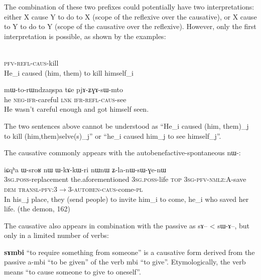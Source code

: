 \documentclass[oldfontcommands,oneside,a4paper,11pt]{article}
\newcommand{\ipa}[1]{{\phon \mbox{#1}}} %
\newcommand{\sg}{\textsc{sg}}
\newcommand{\pl}{\textsc{pl}}
\newcommand{\wav}[1]{}%
\newcommand{\pfv}{\textsc{pfv}}
\newcommand{\auto}{\textsc{autoben}}
\newcommand{\caus}{\textsc{caus}}
\newcommand{\lnk}{\textsc{lnk}}
\newcommand{\dem}{\textsc{dem}}
\newcommand{\evd}{\textsc{ifr}}
\newcommand{\negat}{\textsc{neg}}
\newcommand{\nmlz}{\textsc{nmlz}}
\newcommand{\poss}{\textsc{poss}}
\newcommand{\refl}{\textsc{refl}}
\newcommand{\topic}{\textsc{top}}
\newcommand{\transloc}{\textsc{transl}}
\begin{document}
 The combination of these two prefixes could potentially have two interpretations: either X cause Y to do to X (scope of the reflexive over the causative), or X cause to Y to do to Y (scope of the causative over the reflexive). However, only the first interpretation is possible, as shown by the examples:
\begin{exe}
\ex 
\gll \ipa{pɯ-ʑɣɤ-sɯ-sat}  \\
  \pfv{}-\refl{}-\caus{}-kill \\
\glt   He_i caused (him, them) to kill himself_i
\end{exe}
	\begin{exe}
\ex 
\gll \ipa{ɯʑo} 	\ipa{mɯ-to-rɯndzaŋspa} 	\ipa{tɕe} 	\ipa{pjɤ-ʑɣɤ-sɯ-mto} \\
 he \negat{}-\evd{}-careful \lnk{} \evd{}-\refl{}-\caus{}-see \\
\glt   He wasn't careful enough and got himself seen. \wav{8_ZGAsWmto}
\end{exe}

The two sentences above cannot be understood as  ``He_i caused (him, them)_j to kill (him,them)selve(s)_j'' or ``he_i caused him_j to see himself_j''.


The causative commonly appears with the autobenefactive-spontaneous \ipa{nɯ-}:


 \begin{exe}
\ex 
\gll \ipa{ɯ-sci} 	\ipa{iɕqʰa} 	\ipa{ɯ-sroʁ} 	\ipa{nɯ} 	\ipa{ɯ-kɤ-kɯ-ri} 	\ipa{nɯnɯ} \ipa{ʑ-la-nɯ-sɯ-ɣe-nɯ} \\
3\sg{}.\poss{}-replacement the.aforementioned 3\sg{}.\poss{}-life \topic{} 3\sg{}-\pfv{}-\nmlz{}:A-save \dem{} \transloc{}-\pfv{}:3$\rightarrow$3-\auto{}-\caus{}-come-\pl{} \\
\glt In his_j place, they (send people) to invite him_i to come, he_i who saved her life.    (the demon, 162)
\end{exe}

 The causative also appears in combination with the passive as \ipa{sɤ}-- < \ipa{sɯ-ɤ}--, but only in a limited number of verbs:
 
 
  \textbf{\ipa{sɤmbi}} ``to require something from someone'' is a causative form derived from the passive \ipa{a-mbi} ``to be given'' of the verb \ipa{mbi} ``to give''. Etymologically, the verb means ``to cause someone to give to oneself''. 
  
  
  
\end{document}
